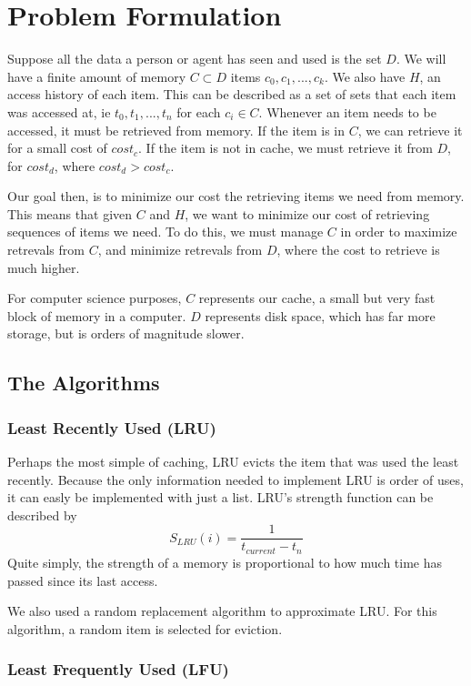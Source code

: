 \documentclass[10pt,letterpaper]{article}
\begin{document}
\section{Problem Formulation}

Suppose all the data a person or agent has seen and used is the set $D$.
We will have a finite amount of memory $C \subset D$  items ${c_0, c_1, ..., c_k}$. We also have $H$, 
an access history of each item. This can be described as a set of sets that each item was accessed at, ie
${t_0, t_1, ..., t_n}$ for each $c_i \in C$. Whenever an item needs to be accessed,
it must be retrieved from memory. If the item is in $C$, we can retrieve it for a small cost of
$cost_{c}$. If the item is not in cache, we must retrieve it from $D$, for $cost_d$, where
$cost_d > cost_c$.

Our goal then, is to minimize our cost the retrieving items we need from memory.
This means that given $C$ and $H$, we want to minimize our cost
of retrieving sequences of items we need. To do this, we must manage $C$ in order to
maximize retrevals from $C$, and minimize retrevals from $D$, where the cost
to retrieve is much higher.

For computer science purposes, $C$ represents our cache, a small but very fast block of
memory in a computer. $D$ represents disk space, which has far more storage, but is
orders of magnitude slower.

\subsection{The Algorithms}


\subsubsection{Least Recently Used (LRU)}

Perhaps the most simple of caching, LRU evicts the item that was used the least
recently. Because the only information needed to implement LRU is order of uses,
it can easly be implemented with just a list. LRU's strength function can be described by
$$
S_{LRU}(i) = \frac{1} {t_{current} - t_n}
$$
Quite simply, the strength of a memory is proportional to how much time has passed since its last
access. 

We also used a random replacement algorithm to approximate LRU. For this algorithm, 
a random item is selected for eviction.

\subsubsection{Least Frequently Used (LFU)}
\end{document}
